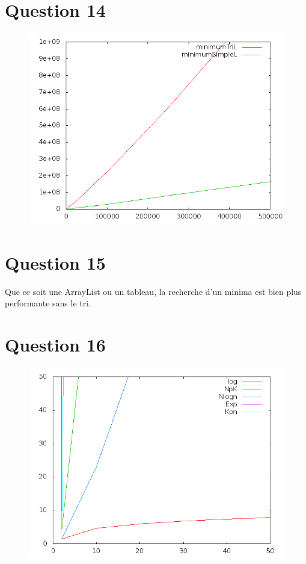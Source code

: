 \documentclass[a4paper,12pt]{report}
\begin{document}
\section*{Question 14}
\begin{figure}[!ht]
	\center
	\includegraphics[scale=0.4]{q14.png}
\end{figure}

\section*{Question 15}
Que ce soit une ArrayList ou un tableau, la recherche d'un minima est bien plus performante sans le tri.

\newpage

\section*{Question 16}
\begin{figure}[!ht]
	\center
	\includegraphics[scale=0.4]{q16.png}
\end{figure}
\end{document}
